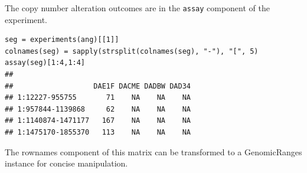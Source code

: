 The copy number alteration outcomes are in the
\texttt{assay} component of the experiment.

\begin{shaded}
\begin{verbatim}
seg = experiments(ang)[[1]]
colnames(seg) = sapply(strsplit(colnames(seg), "-"), "[", 5)
assay(seg)[1:4,1:4]
##
##                   DAE1F DACME DADBW DAD34
## 1:12227-955755       71    NA    NA    NA
## 1:957844-1139868     62    NA    NA    NA
## 1:1140874-1471177   167    NA    NA    NA
## 1:1475170-1855370   113    NA    NA    NA
\end{verbatim}
\end{shaded}

The rownames component of this matrix can be transformed to
a GenomicRanges instance for concise manipulation.


